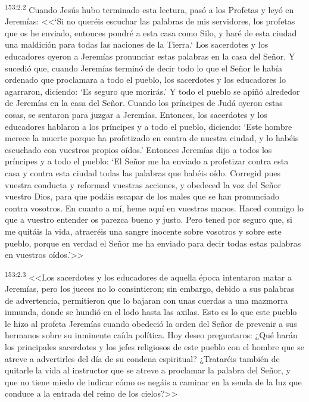 \par 
\textsuperscript{153:2.2} Cuando Jesús hubo terminado esta lectura, pasó a los Profetas y leyó en Jeremías: <<`Si no queréis escuchar las palabras de mis servidores, los profetas que os he enviado, entonces pondré a esta casa como Silo, y haré de esta ciudad una maldición para todas las naciones de la Tierra.` Los sacerdotes y los educadores oyeron a Jeremías pronunciar estas palabras en la casa del Señor. Y sucedió que, cuando Jeremías terminó de decir todo lo que el Señor le había ordenado que proclamara a todo el pueblo, los sacerdotes y los educadores lo agarraron, diciendo: `Es seguro que morirás.' Y todo el pueblo se apiñó alrededor de Jeremías en la casa del Señor. Cuando los príncipes de Judá oyeron estas cosas, se sentaron para juzgar a Jeremías. Entonces, los sacerdotes y los educadores hablaron a los príncipes y a todo el pueblo, diciendo: `Este hombre merece la muerte porque ha profetizado en contra de nuestra ciudad, y lo habéis escuchado con vuestros propios oídos.' Entonces Jeremías dijo a todos los príncipes y a todo el pueblo: `El Señor me ha enviado a profetizar contra esta casa y contra esta ciudad todas las palabras que habéis oído. Corregid pues vuestra conducta y reformad vuestras acciones, y obedeced la voz del Señor vuestro Dios, para que podáis escapar de los males que se han pronunciado contra vosotros. En cuanto a mí, heme aquí en vuestras manos. Haced conmigo lo que a vuestro entender os parezca bueno y justo. Pero tened por seguro que, si me quitáis la vida, atraeréis una sangre inocente sobre vosotros y sobre este pueblo, porque en verdad el Señor me ha enviado para decir todas estas palabras en vuestros oídos.'>>

\par 
\textsuperscript{153:2.3} <<Los sacerdotes y los educadores de aquella época intentaron matar a Jeremías, pero los jueces no lo consintieron; sin embargo, debido a sus palabras de advertencia, permitieron que lo bajaran con unas cuerdas a una mazmorra inmunda, donde se hundió en el lodo hasta las axilas. Esto es lo que este pueblo le hizo al profeta Jeremías cuando obedeció la orden del Señor de prevenir a sus hermanos sobre su inminente caída política. Hoy deseo preguntaros: ¿Qué harán los principales sacerdotes y los jefes religiosos de este pueblo con el hombre que se atreve a advertirles del día de su condena espiritual? ¿Trataréis también de quitarle la vida al instructor que se atreve a proclamar la palabra del Señor, y que no tiene miedo de indicar cómo os negáis a caminar en la senda de la luz que conduce a la entrada del reino de los cielos?>>

